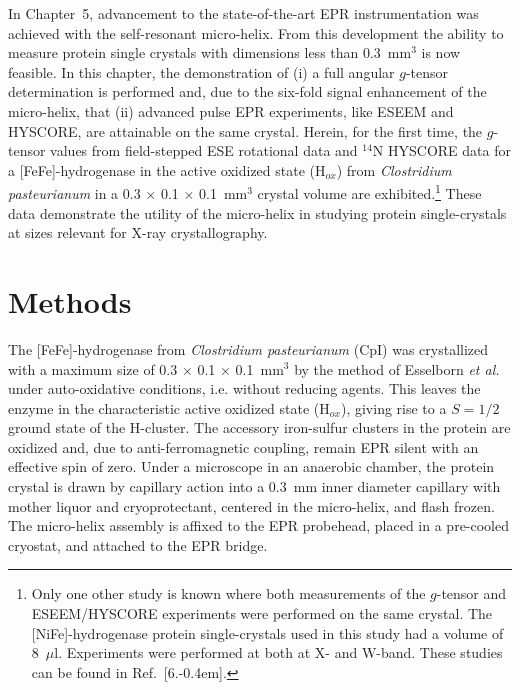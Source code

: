 In Chapter~5, advancement to the state-of-the-art EPR instrumentation was achieved with the self-resonant micro-helix. From this development the ability to measure protein single crystals with dimensions less than 0.3~mm$^3$ is now feasible. In this chapter, the demonstration of (i) a full angular $g$-tensor determination is performed and, due to the six-fold signal enhancement of the micro-helix, that (ii) advanced pulse EPR experiments, like ESEEM and HYSCORE, are attainable on the same crystal. Herein, for the first time, the $g$-tensor values from field-stepped ESE rotational data and $^{14}$N HYSCORE data for a [FeFe]-hydrogenase in the active oxidized state (H$_{ox}$) from \textit{Clostridium pasteurianum} in a 0.3 $\times$ 0.1 $\times$ 0.1~mm$^3$ crystal volume are exhibited.\footnote{Only one other study is known where both measurements of the $g$-tensor and ESEEM/HYSCORE experiments were performed on the same crystal. The [NiFe]-hydrogenase protein single-crystals used in this study had a volume of 8~$\mu$l. Experiments were performed at both at X- and W-band. These studies can be found in Ref.~[6.\kern-0.4em].} These data demonstrate the utility of the micro-helix in studying protein single-crystals at sizes relevant for X-ray crystallography. 

\section{Methods}
The [FeFe]-hydrogenase from \textit{Clostridium pasteurianum} (CpI) was crystallized with a maximum  size of 0.3 $\times$ 0.1 $\times$ 0.1~mm$^3$ by the method of Esselborn \textit{et al.}\cite{FeFeCry} under auto-oxidative conditions, i.e. without reducing agents. This leaves the enzyme in the characteristic active oxidized state (H$_{ox}$), giving rise to a $S=1/2$ ground state of the H-cluster. The accessory iron-sulfur clusters in the protein are oxidized and, due to anti-ferromagnetic coupling, remain EPR silent with an effective spin of zero. \cite{lubitzhyd}  Under a microscope in an anaerobic chamber, the protein crystal is drawn by capillary action into a 0.3~mm inner diameter capillary with mother liquor and cryoprotectant, centered in the micro-helix, and flash frozen. The micro-helix assembly is affixed to the EPR probehead, placed in a pre-cooled cryostat, and attached to the EPR bridge. 

